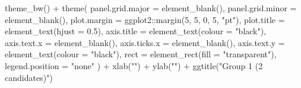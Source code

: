 \documentclass[
  11pt,
  oneside]{book}
\newenvironment{Shaded}{\begin{snugshade}}{\end{snugshade}}
\newcommand{\AttributeTok}[1]{\textcolor[rgb]{0.77,0.63,0.00}{#1}}
\newcommand{\DecValTok}[1]{\textcolor[rgb]{0.00,0.00,0.81}{#1}}
\newcommand{\FloatTok}[1]{\textcolor[rgb]{0.00,0.00,0.81}{#1}}
\newcommand{\FunctionTok}[1]{\textcolor[rgb]{0.00,0.00,0.00}{#1}}
\newcommand{\NormalTok}[1]{#1}
\newcommand{\SpecialCharTok}[1]{\textcolor[rgb]{0.00,0.00,0.00}{#1}}
\newcommand{\StringTok}[1]{\textcolor[rgb]{0.31,0.60,0.02}{#1}}
\begin{document}
\begin{Shaded}
\begin{Highlighting}[]
  \FunctionTok{theme\_bw}\NormalTok{() }\SpecialCharTok{+}
  \FunctionTok{theme}\NormalTok{(}
    \AttributeTok{panel.grid.major =} \FunctionTok{element\_blank}\NormalTok{(),}
    \AttributeTok{panel.grid.minor =} \FunctionTok{element\_blank}\NormalTok{(),}
    \AttributeTok{plot.margin =}\NormalTok{ ggplot2}\SpecialCharTok{::}\FunctionTok{margin}\NormalTok{(}\DecValTok{5}\NormalTok{, }\DecValTok{5}\NormalTok{, }\DecValTok{0}\NormalTok{, }\DecValTok{5}\NormalTok{, }\StringTok{"pt"}\NormalTok{),}
    \AttributeTok{plot.title =} \FunctionTok{element\_text}\NormalTok{(}\AttributeTok{hjust =} \FloatTok{0.5}\NormalTok{),}
    \AttributeTok{axis.title =} \FunctionTok{element\_text}\NormalTok{(}\AttributeTok{colour =} \StringTok{"black"}\NormalTok{),}
    \AttributeTok{axis.text.x =} \FunctionTok{element\_blank}\NormalTok{(),}
    \AttributeTok{axis.ticks.x =} \FunctionTok{element\_blank}\NormalTok{(),}
    \AttributeTok{axis.text.y =} \FunctionTok{element\_text}\NormalTok{(}\AttributeTok{colour =} \StringTok{"black"}\NormalTok{),}
    \AttributeTok{rect =} \FunctionTok{element\_rect}\NormalTok{(}\AttributeTok{fill =} \StringTok{"transparent"}\NormalTok{),}
    \AttributeTok{legend.position =} \StringTok{"none"}
\NormalTok{  ) }\SpecialCharTok{+}
  \FunctionTok{xlab}\NormalTok{(}\StringTok{""}\NormalTok{) }\SpecialCharTok{+}
  \FunctionTok{ylab}\NormalTok{(}\StringTok{""}\NormalTok{) }\SpecialCharTok{+}
  \FunctionTok{ggtitle}\NormalTok{(}\StringTok{"Group 1 (2 candidates)"}\NormalTok{)}
\end{Highlighting}
\end{Shaded}
\end{document}
